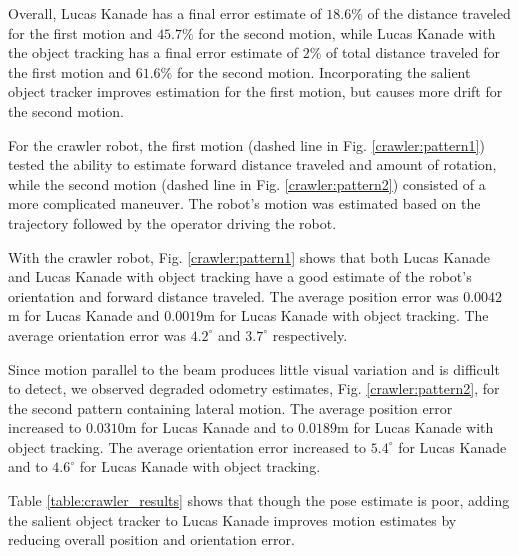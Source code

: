 \documentclass[letterpaper, 10 pt, conference]{ieeeconf}
\begin{document}
Overall, Lucas Kanade has a final error estimate of $18.6 \%$ of the distance traveled for the first motion and $45.7 \%$ for the second motion, while Lucas Kanade with the object tracking has a final error estimate of $2 \%$ of total distance traveled for the first motion and $61.6 \%$ for the second motion. Incorporating the salient object tracker improves estimation for the first motion, but causes more drift for the second motion.

For the crawler robot, the first motion (dashed line in Fig. \ref{crawler:pattern1}) tested the ability to estimate forward distance traveled and amount of rotation, while the second motion  (dashed line in Fig. \ref{crawler:pattern2}) consisted of a more complicated maneuver. The robot's motion was estimated based on the trajectory followed by the operator driving the robot.

With the crawler robot, Fig. \ref{crawler:pattern1} shows that both Lucas Kanade and Lucas Kanade with object tracking have a good estimate of the robot's orientation and forward distance traveled. The average position error was $0.0042$m for Lucas Kanade and $0.0019$m for Lucas Kanade with object tracking. The average orientation error was $4.2^{\circ}$ and $3.7^{\circ}$ respectively. 

Since motion parallel to the beam produces little visual variation and is difficult to detect, we observed degraded odometry estimates, Fig. \ref{crawler:pattern2}, for the second pattern containing lateral motion. The average position error increased to $0.0310$m for Lucas Kanade and to $0.0189$m for Lucas Kanade with object tracking. The average orientation error increased to $5.4^{\circ}$ for Lucas Kanade and to $4.6^{\circ}$ for Lucas Kanade with object tracking.

Table \ref{table:crawler_results} shows that though the pose estimate is poor, adding the salient object tracker to Lucas Kanade improves motion estimates by reducing overall position and orientation error.
\end{document}
